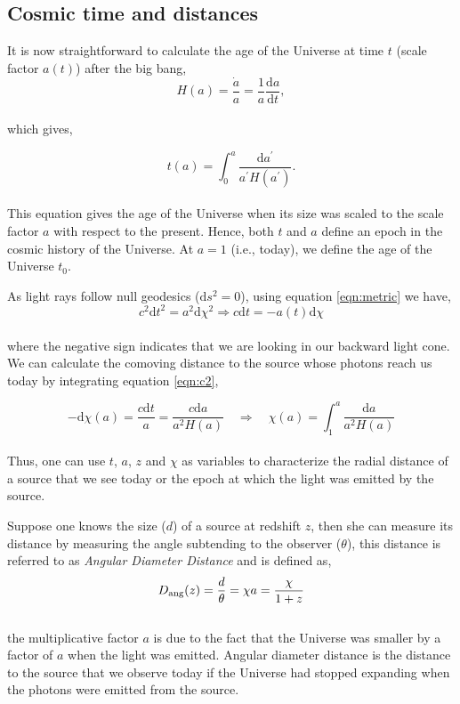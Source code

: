 \subsection{Cosmic time and distances}


It is now straightforward to calculate the age of the Universe at time $t$ (scale factor $a(t)$) after the big bang,
\begin{equation}
	H(a) = \dfrac{\dot{a}}{a} = \dfrac{1}{a} \dfrac{\mathrm{d}a}{\mathrm{d}t},
\end{equation}
\\
which gives,

\begin{equation}
	t(a) = \int_0^a \dfrac{\mathrm{d}a^{\prime}}{a^{\prime}H(a^{\prime})}.
\end{equation}
\\
This equation gives the age of the Universe when its size was
scaled to the scale factor $a$ with respect to the present. Hence, both $t$ and
$a$ define an epoch in the cosmic history of the Universe. At $a=1$ (i.e., today),
we define the age of the Universe $t_0$.

As light rays follow null geodesics ($\mathrm{d}s^2=0$), using equation 
\ref{eqn:metric} we have,
\begin{equation}
	c^2\mathrm{d}t^2 = a^2\mathrm{d}\chi^2 \Rightarrow c\mathrm{d}t = -a(t)\mathrm{d}\chi
	\label{eqn:c2}
\end{equation}
\\
where the negative sign indicates that we are looking in our backward light cone. 
We can calculate the comoving distance to the source whose photons reach us
today by integrating equation \ref{eqn:c2},

\begin{equation}
	-\mathrm{d}\chi(a) = \dfrac{c\mathrm{d}t}{a} = 
	 \dfrac{c\mathrm{d}a}{a^2 H(a)} \quad
	 \Rightarrow \quad \chi(a) = \int_1^a \dfrac{\mathrm{d}a}{a^2H(a)}
\end{equation}
\\
Thus, one can use $t$, $a$, $z$ and $\chi$ as variables to characterize the
radial distance of a source that we see today or the epoch at which the light was
emitted by the source. 

Suppose one knows the size ($d$) of a source at redshift $z$, then she can measure its
distance by measuring the angle subtending to the observer ($\theta$), this distance is referred
to as {\it Angular Diameter Distance} and is defined as,
\begin{equation}
	D_{\rm ang}(z) = \dfrac{d}{\theta} = \chi a = \dfrac{\chi}{1+z}
\end{equation}
\\
the multiplicative factor $a$ is due to the fact that the Universe was smaller by 
a factor of $a$ when the light was emitted.  Angular diameter distance 
is the distance to the source that we observe today if the Universe had
stopped expanding when the photons were emitted from the source.

